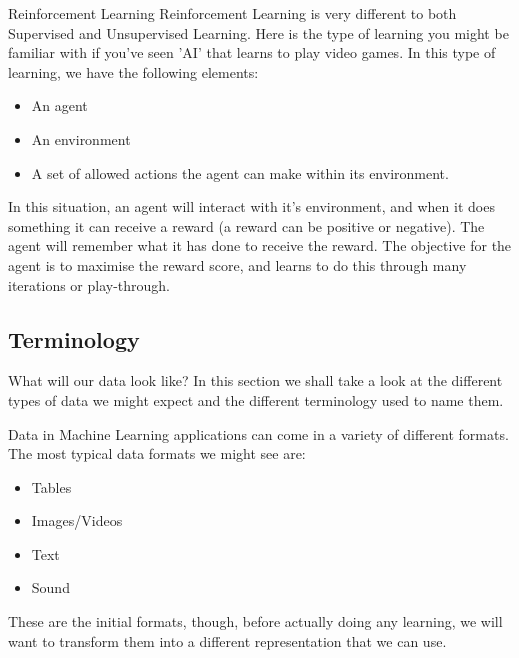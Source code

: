 \documentclass[10pt]{beamer}
\begin{document}
\begin{frame}[label={sec:org7bbda04}]{Reinforcement Learning}
Reinforcement Learning is very different to both Supervised and Unsupervised
Learning. Here is the type of learning you might be familiar with if you've seen 'AI'
that learns to play video games. In this type of learning, we have the following
elements:

\begin{itemize}
\item An agent
\item An environment
\item A set of allowed actions the agent can make within its environment.
\end{itemize}

In this situation, an agent will interact with it's environment, and when it does
something it can receive a reward (a reward can be positive or negative). The agent
will remember what it has done to receive the reward. The objective for the agent is
to maximise the reward score, and learns to do this through many iterations or
play-through.
\end{frame}

\subsection*{Terminology}
\label{sec:orgb6bb86e}

\begin{frame}[label={sec:orgf13e762}]{What will our data look like?}
In this section we shall take a look at the different types of data we might expect
and the different terminology used to name them.

Data in Machine Learning applications can come in a variety of different formats. The
most typical data formats we might see are:

\begin{itemize}
\item Tables
\item Images/Videos
\item Text
\item Sound
\end{itemize}

These are the initial formats, though, before actually doing any learning, we will
want to transform them into a different representation that we can use.
\end{frame}
\end{document}
